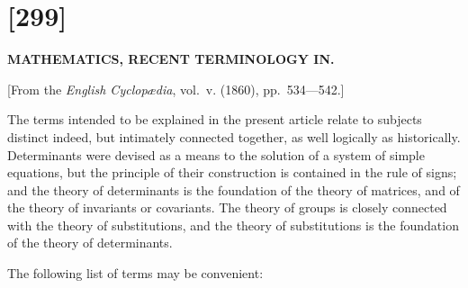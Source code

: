 \documentclass[12pt,a4paper]{article}
\theoremstyle{definition}
\begin{document}
\newpage


\section*{[299]}

\begin{center}
\Large\bfseries MATHEMATICS, RECENT TERMINOLOGY IN.
\end{center}

\begin{center}
[From the \textit{English Cyclop\ae dia}, vol.~v. (1860), pp.~534---542.]
\end{center}

\vspace{1em}

The terms intended to be explained in the present article relate to subjects distinct indeed, but intimately connected together, as well logically as historically. Determinants were devised as a means to the solution of a system of simple equations, but the principle of their construction is contained in the rule of signs; and the theory of determinants is the foundation of the theory of matrices, and of the theory of invariants or covariants. The theory of groups is closely connected with the theory of substitutions, and the theory of substitutions is the foundation of the theory of determinants.

\vspace{1em}

The following list of terms may be convenient:
\end{document}
